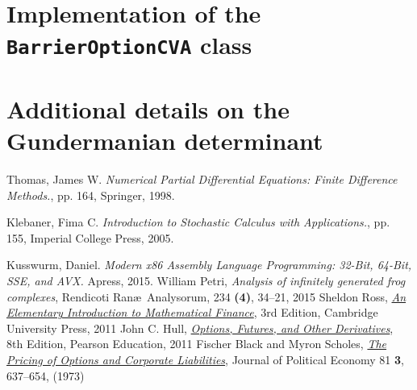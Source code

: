 \documentclass[12pt, oneside]{book}
\theoremstyle{plain}
\theoremstyle{definition}
\begin{document}
\appendix
\chapter{Implementation of the {\tt BarrierOptionCVA} class}
\lipsum[100]
\chapter[shorter running title]{Additional details on the Gundermanian determinant}
\lipsum[100]




\begin{thebibliography}{12}
 Thomas, James W. {\it Numerical Partial Differential Equations: Finite Difference Methods.}, pp. 164, Springer, 1998.

Klebaner, Fima C. {\it Introduction to Stochastic Calculus with Applications.}, pp. 155, Imperial College Press, 2005.

Kusswurm, Daniel. {\it Modern x86 Assembly Language Programming: 32-Bit, 64-Bit, SSE, and AVX.} Apress, 2015.
   William Petri, 
  {\it Analysis of infinitely generated frog complexes},
	Rendicoti Ran\ae \ Analysorum, 234 {\bf (4)}, 34--21, 2015
  Sheldon Ross, {\it 
  \href{https://www-dawsonera-com.ezproxy.library.qmul.ac.uk/abstract/9781139069694}{An Elementary Introduction to Mathematical Finance}},
	3rd Edition, Cambridge University Press, 2011
	John C. Hull, 
	{\it \href{https://www-dawsonera-com.ezproxy.library.qmul.ac.uk/abstract/9781447930419}{Options, Futures, and Other Derivatives}},
	8th Edition, Pearson Education, 2011
	Fischer Black and  Myron Scholes,
	{\it \href{https://www.cs.princeton.edu/courses/archive/fall09/cos323/papers/black_scholes73.pdf}
	{The Pricing of Options and Corporate Liabilities}},
	Journal of Political Economy 81 {\bf 3}, 637--654,  (1973)
	
\end{thebibliography}
\end{document}
